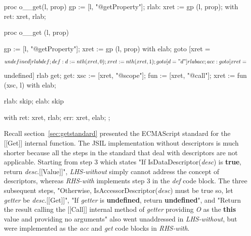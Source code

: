 \documentclass[a4paper,11pt,twoside]{report}
\begin{document}
\begin{minipage}{.45\textwidth}
\begin{lstjsil}
proc o__get(l, prop) {
          gp := [l, "@getProperty"];
    rlab: xret := gp (l, prop);
}
with
{
    ret: xret, rlab;
}
\end{lstjsil}
\end{minipage}%
\hfill
\begin{minipage}{.50\textwidth}
\begin{lstjsil}
proc o__get (l, prop) {
			gp := [l, "@getProperty"];
			xret := gp (l, prop) with elab;	
			goto [xret = $$undefined] rlab def;
			
	def:	d := nth (xret, 0);
			xret := nth (xret, 1);
			goto [d = "d"] rlab acc;
			
	acc:	goto [xret = $$undefined] rlab get;
	get:	xsc := [xret, "@scope"];
			fun := [xret, "@call"];
			xret := fun (xsc, l) with elab;
			
	rlab:	skip;
	elab:	skip
}
with
{
    ret: xret, rlab;
    err: xret, elab;
};
\end{lstjsil}
\end{minipage}

Recall section~\ref{sec:getstandard} presented the ECMAScript standard for the [[Get]] internal function. The JSIL implementation without descriptors is much shorter because all the steps in the standard that deal with descriptors are not applicable. Starting from step 3 which states "If IsDataDescriptor(\textit{desc}) is \textbf{true}, return \textit{desc}.[[Value]]", \textit{LHS-without} simply cannot address the concept of descriptors, whereas \textit{RHS-with} implements step 3 in the \textit{def} code block. The three subsequent steps, "Otherwise, IsAccessorDescriptor(\textit{desc}) must be true so, let \textit{getter} be \textit{desc}.[[Get]]", "If \textit{getter} is \textbf{undefined}, return \textbf{undefined}", and "Return the result calling the [[Call]] internal method of \textit{getter} providing \textit{O} as the \textbf{this} value and providing no arguments" also went unaddressed in \textit{LHS-without}, but were implemented as the \textit{acc} and \textit{get} code blocks in \textit{RHS-with}.
\end{document}
